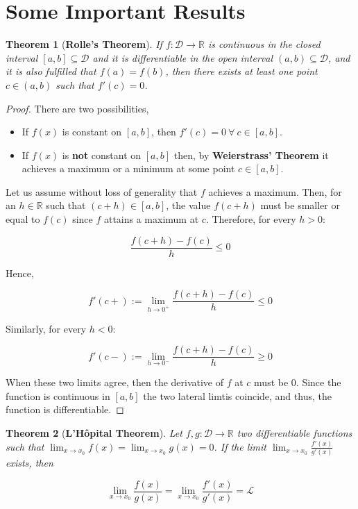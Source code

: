 \documentclass[11pt]{article}
\theoremstyle{definition}
\theoremstyle{plain}
\newtheorem{theorem}{Theorem}
\begin{document}
    \section{Some Important Results}\label{some-important-results}

\begin{theorem}[\textbf{Rolle's Theorem}]
If \(f:\mathcal{D}\rightarrow\mathbb{R}\) is continuous in the closed
interval \([a,b]\subseteq\mathcal{D}\) and it is differentiable in the
open interval \((a,b)\subseteq\mathcal{D}\), and it is also fulfilled
that \(f(a) = f(b)\), then there exists \emph{at least} one point
\(c\in(a,b)\) such that \(f'(c) = 0\).
\end{theorem}

\begin{proof}
There are two possibilities, 

\begin{itemize}
    \item If \(f(x)\) is constant on \([a,b]\), then \(f'(c) = 0 \ \forall \ c\in[a,b]\). 

    \item If \(f(x)\) is \textbf{not} constant on \([a,b]\) then, by \textbf{Weierstrass' Theorem} it achieves a maximum or a minimum at some point \(c\in[a,b]\). 
\end{itemize}

Let us assume without loss of generality that \(f\) achieves a maximum. Then, for an \(h\in\mathbb{R}\) such that \((c+h)\in[a,b]\), the value \(f(c+h)\) must be smaller or equal to \(f(c)\) since \(f\) attains a maximum at \(c\). Therefore, for every \(h > 0\):

\[
\frac{f(c + h)-f(c)}{h} \leq 0
\]

Hence,

\[
f'(c+) := \lim_{h\rightarrow 0^+}{\frac{f(c+h)-f(c)}{h}} \leq 0
\]

Similarly, for every \(h < 0\):

\[
f'(c-) := \lim_{h\rightarrow 0^-}{\frac{f(c+h)-f(c)}{h}} \geq 0
\]

When these two limits agree, then the derivative of \(f\) at \(c\) must
be \(0\). Since the function is continuous in \([a,b]\) the two lateral
limtis coincide, and thus, the function is differentiable.
\end{proof}

\begin{theorem}[\textbf{L'H\^opital Theorem}]
Let \(f,g : \mathcal{D} \rightarrow \mathbb{R}\) two differentiable
functions such that \(\lim_{x\rightarrow x_0} f(x) = \lim_{x\rightarrow x_0} g(x) = 0\). If the limit \(\lim_{x\rightarrow x_0}{\frac{f'(x)}{g'(x)}}\) exists, then

\[
\lim_{x\rightarrow x_0}{\frac{f(x)}{g(x)}} = \lim_{x\rightarrow x_0}{\frac{f'(x)}{g'(x)}} = \mathcal{L}
\]
\end{theorem}
\end{document}
